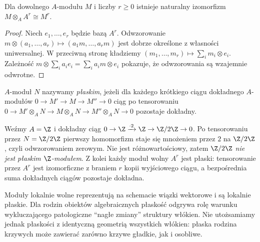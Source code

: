 \begin{stwierdzenie}
Dla dowolnego $A$-modułu $M$ i liczby $r\ge0$
istnieje naturalny izomorfizm
$M\otimes_A A^r\cong M^r$.
\end{stwierdzenie}
\begin{proof}
Niech $e_1,\ldots,e_r$ będzie bazą $A^r$.
Odwzorowanie $m\otimes(a_1,\ldots,a_r)
\mapsto(a_1m,\ldots,a_rm)$ jest dobrze określone
z własności uniwersalnej. W przeciwną stronę
kładziemy $(m_1,\ldots,m_r)\mapsto
\sum_i m_i\otimes e_i$. Zależność
$m\otimes\sum_i a_i e_i=\sum_i a_i m\otimes e_i$
pokazuje, że odwzorowania są wzajemnie odwrotne.
\end{proof}

\begin{definicja}
$A$-moduł $N$ nazywamy \emph{płaskim},
jeżeli dla każdego krótkiego ciągu dokładnego
$A$-modułów $0\to M'\to M\to M''\to0$
ciąg po tensorowaniu
$0\to M'\otimes_A N\to M\otimes_A N
\to M''\otimes_A N\to0$ pozostaje dokładny.
\end{definicja}

\begin{przyklad}
Weźmy $A=\Z$ i dokładny ciąg
$0\to\Z\xrightarrow{\cdot2}\Z\to\Z/2\Z\to0$.
Po tensorowaniu przez $N=\Z/2\Z$ pierwszy
homomorfizm staje się mnożeniem przez $2$
na $\Z/2\Z$, czyli odwzorowaniem zerowym.
Nie jest różnowartościowy, zatem $\Z/2\Z$
\emph{nie jest płaskim $\Z$-modułem}.
Z kolei każdy moduł wolny $A^r$ jest płaski:
tensorowanie przez $A^r$ jest izomorficzne
z braniem $r$ kopii wyjściowego ciągu,
a bezpośrednia suma dokładnych ciągów pozostaje
dokładna.
\end{przyklad}

\begin{uwaga}
Moduły lokalnie wolne reprezentują na schemacie
wiązki wektorowe i są lokalnie płaskie.
Dla rodzin obiektów algebraicznych płaskość
odgrywa rolę warunku wykluczającego patologiczne
``nagłe zmiany'' struktury włókien. Nie utożsamiamy
jednak płaskości z identyczną geometrią wszystkich
włókien: płaska rodzina krzywych może zawierać
zarówno krzywe gładkie, jak i osobliwe.
\end{uwaga}


